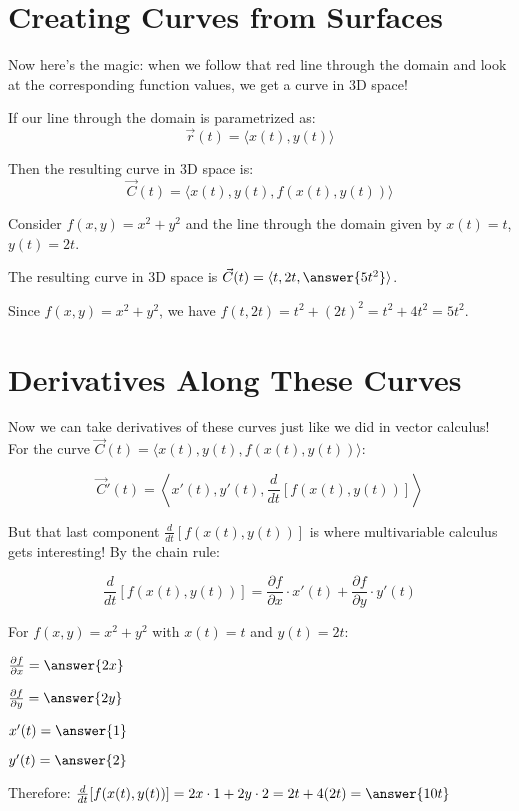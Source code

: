 \documentclass{ximera}
\begin{document}
\section{Creating Curves from Surfaces}

Now here's the magic: when we follow that red line through the domain and look at the corresponding function values, we get a curve in 3D space!

If our line through the domain is parametrized as:
$$\vec{r}(t) = \langle x(t), y(t) \rangle$$

Then the resulting curve in 3D space is:
$$\vec{C}(t) = \langle x(t), y(t), f(x(t), y(t)) \rangle$$

\begin{exercise}
Consider $f(x,y) = x^2 + y^2$ and the line through the domain given by $x(t) = t$, $y(t) = 2t$.

The resulting curve in 3D space is $\vec{C}(t) = \langle t, 2t, \answer{5t^2} \rangle$.

\begin{feedback}
Since $f(x,y) = x^2 + y^2$, we have $f(t, 2t) = t^2 + (2t)^2 = t^2 + 4t^2 = 5t^2$.
\end{feedback}
\end{exercise}

\section{Derivatives Along These Curves}

Now we can take derivatives of these curves just like we did in vector calculus! For the curve $\vec{C}(t) = \langle x(t), y(t), f(x(t), y(t)) \rangle$:

$$\vec{C}'(t) = \left\langle x'(t), y'(t), \frac{d}{dt}[f(x(t), y(t))] \right\rangle$$

But that last component $\frac{d}{dt}[f(x(t), y(t))]$ is where multivariable calculus gets interesting! By the chain rule:

$$\frac{d}{dt}[f(x(t), y(t))] = \frac{\partial f}{\partial x} \cdot x'(t) + \frac{\partial f}{\partial y} \cdot y'(t)$$

\begin{exercise}
For $f(x,y) = x^2 + y^2$ with $x(t) = t$ and $y(t) = 2t$:

$\frac{\partial f}{\partial x} = \answer{2x}$

$\frac{\partial f}{\partial y} = \answer{2y}$

$x'(t) = \answer{1}$

$y'(t) = \answer{2}$

Therefore: $\frac{d}{dt}[f(x(t), y(t))] = 2x \cdot 1 + 2y \cdot 2 = 2t + 4(2t) = \answer{10t}$
\end{exercise}
\end{document}
